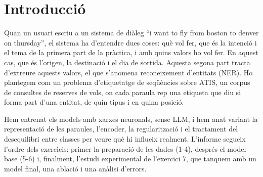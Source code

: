 \section{Introducció}
\label{sec:intro}

Quan un usuari escriu a un sistema de diàleg ``i want to fly from boston to denver on thursday'', el sistema ha
d'entendre dues coses: què vol fer, que és la intenció i el tema de la primera part de la pràctica, i amb quins
valors ho vol fer. En aquest cas, que  és l'origen,  la destinació i  el dia
de sortida. Aquesta segona part tracta d'extreure aquests valors, el que s'anomena reconeixement d'entitats (NER).
Ho plantegem com un problema d'etiquetatge de seqüències sobre ATIS, un corpus de consultes de reserves de vols,
on cada paraula rep una etiqueta que diu si forma part d'una entitat, de quin tipus i en quina posició.

Hem entrenat els models amb xarxes neuronals, sense LLM, i hem anat variant la representació de les paraules,
l'encoder, la regularització i el tractament del desequilibri entre classes per veure què hi influeix realment.
L'informe segueix l'ordre dels exercicis: primer la preparació de les dades (1-4), després el model base (5-6) i,
finalment, l'estudi experimental de l'exercici 7, que tanquem amb un model final, una ablació i una anàlisi
d'errors.
